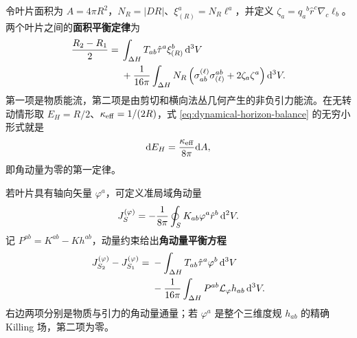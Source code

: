 令叶片面积为 $A=4\pi R^2$，$N_R=|D R|$、$\xi^a_{(R)}=N_R\ell^a$，并定义 $\zeta_a=q_a{}^b\hat r^c\nabla_c\ell_b$。两个叶片之间的\textbf{面积平衡定律}为
\begin{equation}\label{eq:dynamical-horizon-balance}
\begin{split}
    \frac{R_2-R_1}{2}={}&
    \int_{\Delta H}T_{ab}\hat\tau^a\xi^b_{(R)}\,\dd^3V\\
    &+\frac{1}{16\pi}\int_{\Delta H}N_R
      \left(\sigma^{(\ell)}_{ab}\sigma_{(\ell)}^{ab}
      +2\zeta_a\zeta^a\right)\dd^3V .
\end{split}
\end{equation}
第一项是物质能流，第二项是由剪切和横向法丛几何产生的非负引力能流。在无转动情形取 $E_H=R/2$、$\kappa_{\rm eff}=1/(2R)$，式 \eqref{eq:dynamical-horizon-balance} 的无穷小形式就是
\begin{equation}\label{eq:dh-nonrotating-first-law}
    \dd E_H=\frac{\kappa_{\rm eff}}{8\pi}\dd A ,
\end{equation}
即角动量为零的第一定律。

若叶片具有轴向矢量 $\varphi^a$，可定义准局域角动量
\begin{equation}\label{eq:dh-angular-momentum}
    J_S^{(\varphi)}
      =-\frac{1}{8\pi}\oint_S K_{ab}\varphi^a\hat r^b\,\dd^2V .
\end{equation}
记 $P^{ab}=K^{ab}-Kh^{ab}$，动量约束给出\textbf{角动量平衡方程}
\begin{equation}\label{eq:dh-angular-momentum-balance}
\begin{split}
    J_{S_2}^{(\varphi)}-J_{S_1}^{(\varphi)}
      ={}&-\int_{\Delta H}T_{ab}\hat\tau^a\varphi^b\,\dd^3V\\
       &-\frac{1}{16\pi}\int_{\Delta H}
          P^{ab}\mathcal L_\varphi h_{ab}\,\dd^3V .
\end{split}
\end{equation}
右边两项分别是物质与引力的角动量通量；若 $\varphi^a$ 是整个三维度规 $h_{ab}$ 的精确 Killing 场，第二项为零。

